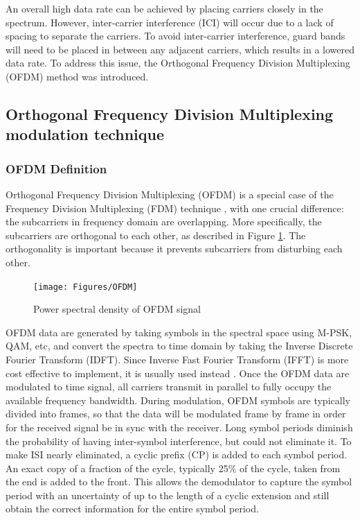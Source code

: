 An overall high data rate can be achieved by placing carriers closely in the spectrum. However, inter-carrier interference (ICI) will occur due to a lack of spacing to separate the carriers. To avoid inter-carrier interference, guard bands will need to be placed in between any adjacent carriers, which results in a lowered data rate. To address this issue, the 
Orthogonal Frequency Division Multiplexing (OFDM) method was introduced.

\subsection{Orthogonal Frequency Division Multiplexing modulation technique}
\subsubsection{OFDM Definition}
Orthogonal Frequency Division Multiplexing (OFDM) is a special case of the Frequency Division Multiplexing (FDM) technique \cite{OFDM2010}, with one crucial difference: the subcarriers in frequency domain are overlapping. More specifically, the subcarriers are orthogonal to each other, as described in Figure \ref{fig:OFDM}. The orthogonality is important because it prevents subcarriers from disturbing each other.

\begin{figure}[htbp]
    \centering
    \texttt{[image: Figures/OFDM]}
    \caption{Power spectral density of OFDM signal}
    \label{fig:OFDM}
\end{figure}

OFDM data are generated by taking symbols in the spectral space using M-PSK, QAM, etc, and convert the spectra to time domain by taking the Inverse Discrete Fourier Transform (IDFT). Since Inverse Fast Fourier Transform (IFFT) is more cost effective to implement, it is usually used instead \cite{b3}. Once the OFDM data are modulated to time signal, all carriers transmit in parallel to fully occupy the available frequency bandwidth. During modulation, OFDM symbols are typically divided into frames, so that the data will be modulated frame by frame in order for the received signal be in sync with the receiver. Long symbol periods diminish the probability of having inter-symbol interference, but could not eliminate it. To make ISI nearly eliminated, a cyclic prefix (CP) is added to each symbol period. An exact copy of a fraction of the cycle, typically 25\% of the cycle, taken from the end is added to the front. This allows the demodulator to capture the symbol period with an uncertainty of up to the length of a cyclic extension and still obtain the correct information for the entire symbol period.

